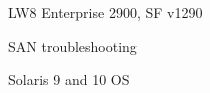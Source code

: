 \documentclass[10pt]{article}
\newenvironment{innerlist}[1][\enskip\textbullet]%
        {\begin{compactitem}[#1]}{\end{compactitem}}
\begin{document}
\begin{innerlist}
\item LW8 Enterprise 2900, SF v1290
\item SAN troubleshooting
\item Solaris 9 and 10 OS
\end{innerlist}
\end{document}
